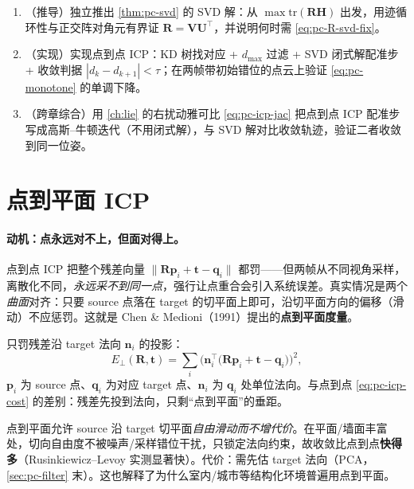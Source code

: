 \begin{practice}
\begin{enumerate}
  \item （推导）独立推出 \cref{thm:pc-svd} 的 SVD 解：从 $\max\mathrm{tr}(\mathbf{R}\mathbf{H})$ 出发，用迹循环性与正交阵对角元有界证 $\mathbf{R}=\mathbf{V}\mathbf{U}^\top$，并说明何时需 \cref{eq:pc-R-svd-fix}。
  \item （实现）实现点到点 ICP：KD 树找对应 + $d_{\max}$ 过滤 + SVD 闭式解配准步 + 收敛判据 $|d_k-d_{k+1}|<\tau$；在两帧带初始错位的点云上验证 \cref{eq:pc-monotone} 的单调下降。
  \item （跨章综合）用 \cref{ch:lie} 的右扰动雅可比 \cref{eq:pc-icp-jac} 把点到点 ICP 配准步写成高斯--牛顿迭代（不用闭式解），与 SVD 解对比收敛轨迹，验证二者收敛到同一位姿。
\end{enumerate}
\end{practice}

\section{点到平面 ICP}
\label{sec:pc-p2plane}

\paragraph{动机：点永远对不上，但面对得上。}
点到点 ICP 把整个残差向量 $\|\mathbf{R}\mathbf{p}_i+\mathbf{t}-\mathbf{q}_i\|$ 都罚——但两帧从不同视角采样，离散化不同，\emph{永远采不到同一点}，强行让点重合会引入系统误差。真实情况是两个\emph{曲面}对齐：只要 source 点落在 target 的切平面上即可，沿切平面方向的偏移（滑动）不应惩罚。这就是 Chen \& Medioni（1991）提出的\textbf{点到平面度量}\cite{chen1992pointplane}。

\begin{definition}[点到平面误差度量]\label{def:pc-p2plane}
只罚残差沿 target 法向 $\mathbf{n}_i$ 的投影：
\begin{equation}
  E_{\perp}(\mathbf{R},\mathbf{t})=\sum_i\Big(\mathbf{n}_i^\top\big(\mathbf{R}\mathbf{p}_i+\mathbf{t}-\mathbf{q}_i\big)\Big)^2,
  \label{eq:pc-p2plane-cost}
\end{equation}
$\mathbf{p}_i$ 为 source 点、$\mathbf{q}_i$ 为对应 target 点、$\mathbf{n}_i$ 为 $\mathbf{q}_i$ 处单位法向。与点到点 \cref{eq:pc-icp-cost} 的差别：残差先投到法向，只剩“点到平面”的垂距。
\end{definition}

\begin{insight}
点到平面允许 source 沿 target 切平面\emph{自由滑动而不增代价}。在平面/墙面丰富处，切向自由度不被噪声/采样错位干扰，只锁定法向约束，故收敛比点到点\textbf{快得多}（Rusinkiewicz--Levoy 实测显著快）。代价：需先估 target 法向（PCA，\cref{sec:pc-filter} 末）。这也解释了为什么室内/城市等结构化环境普遍用点到平面。
\end{insight}

